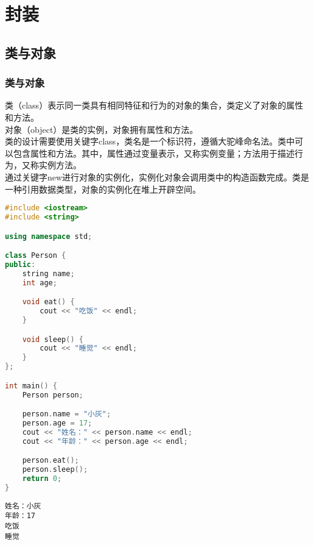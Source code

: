 \chapter{封装}

\section{类与对象}

\subsection{类与对象}

类（class）表示同一类具有相同特征和行为的对象的集合，类定义了对象的属性和方法。\\

对象（object）是类的实例，对象拥有属性和方法。\\

类的设计需要使用关键字class，类名是一个标识符，遵循大驼峰命名法。类中可以包含属性和方法。其中，属性通过变量表示，又称实例变量；方法用于描述行为，又称实例方法。\\

通过关键字new进行对象的实例化，实例化对象会调用类中的构造函数完成。类是一种引用数据类型，对象的实例化在堆上开辟空间。\\


\begin{lstlisting}[language=C++]
#include <iostream>
#include <string>

using namespace std;

class Person {
public:
    string name;
    int age;

    void eat() {
        cout << "吃饭" << endl;
    }

    void sleep() {
        cout << "睡觉" << endl;
    }
};

int main() {
    Person person;

    person.name = "小灰";
    person.age = 17;
    cout << "姓名：" << person.name << endl;
    cout << "年龄：" << person.age << endl;

    person.eat();
    person.sleep();
    return 0;
}
\end{lstlisting}

\begin{tcolorbox}
	\begin{verbatim}
姓名：小灰
年龄：17
吃饭
睡觉
	\end{verbatim}
\end{tcolorbox}

